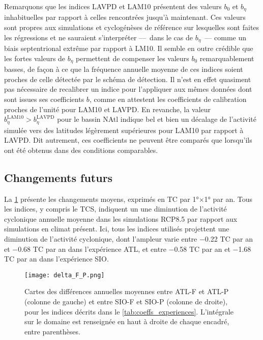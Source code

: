 \documentclass[../main.tex]{subfiles}
\begin{document}
Remarquons que les indices LAVPD et LAM10 présentent des valeurs $b_0$ et $b_\eta$ inhabituelles par rapport à celles rencontrées jusqu'à maintenant. Ces
valeurs sont propres aux simulations et cyclogénèses de référence sur lesquelles sont faites les régressions et ne sauraient s'interpréter ---~dans le cas de
$b_\eta$~--- comme un biais septentrional extrême par rapport à LM10. Il semble en outre crédible que les fortes valeurs de $b_\eta$ permettent de compenser les
valeurs $b_0$ remarquablement basses, de façon à ce que la fréquence annuelle moyenne de ces indices soient proches de celle détectée par le schéma de
détection. Il n'est en effet quasiment pas nécessaire de recalibrer un indice pour l'appliquer aux mêmes données dont sont issues ses coefficients $b$, comme en
attestent les coefficients de calibration proches de l'unité pour LAM10 et LAVPD. En revanche, la valeur $b_\eta^{\mathrm{LAM10}} > b_\eta^{\mathrm{LAVPD}}$
pour le bassin NAtl indique bel et bien un décalage de l'activité simulée vers des latitudes légèrement supérieures pour LAM10 par rapport à LAVPD. Dit
autrement, ces coefficients ne peuvent être comparés que lorsqu'ils ont été obtenus dans des conditions comparables.

\subsection{Changements futurs}

La \cref{fig:delta_F_P} présente les changements moyens, exprimés en TC par \ang{1}$\times$\ang{1} par an. Tous les indices, y compris le TCS, indiquent un une
diminution de l'activité cyclonique annuelle moyenne dans les simulations RCP8.5 par rapport aux simulations en climat présent. Ici, tous les indices utilisés
projettent une diminution de l'activité cyclonique, dont l'ampleur varie entre \num{-0.22} TC par an et \num{-0.68} TC par an dans l'expérience ATL, et entre
\num{-0.58} TC par an et \num{-1.68} TC par an dans l'expérience SIO.

\begin{figure}[htbp]
    \centering
    \texttt{[image: delta\_F\_P.png]}
    \caption{Cartes des différences annuelles moyennes entre ATL-F et ATL-P (colonne de gauche) et entre SIO-F et SIO-P (colonne de droite), pour les indices
    décrits dans le \cref{tab:coeffs_experiences}. L'intégrale sur le domaine est renseignée en haut à droite de chaque encadré, entre parenthèses.}
    \label{fig:delta_F_P}
\end{figure}
\end{document}
